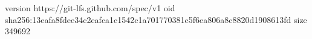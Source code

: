 version https://git-lfs.github.com/spec/v1
oid sha256:13eafa8fdee34c2eafca1c1542c1a701770381c5f6ea806a8c8820d1908613fd
size 349692
